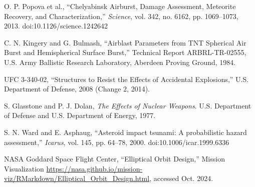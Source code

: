 \documentclass[conference]{IEEEtran}
\begin{document}
\begin{thebibliography}{00}
	O. P. Popova et al., ``Chelyabinsk Airburst, Damage Assessment, Meteorite Recovery, and Characterization,'' \textit{Science}, vol. 342, no. 6162, pp. 1069--1073, 2013. doi:10.1126/science.1242642

	C. N. Kingery and G. Bulmash, ``Airblast Parameters from TNT Spherical Air Burst and Hemispherical Surface Burst,'' Technical Report ARBRL-TR-02555, U.S. Army Ballistic Research Laboratory, Aberdeen Proving Ground, 1984.

	UFC 3-340-02, ``Structures to Resist the Effects of Accidental Explosions,'' U.S. Department of Defense, 2008 (Change 2, 2014).

	S. Glasstone and P. J. Dolan, \textit{The Effects of Nuclear Weapons}. U.S. Department of Defense and U.S. Department of Energy, 1977.

	S. N. Ward and E. Asphaug, ``Asteroid impact tsunami: A probabilistic hazard assessment,'' \textit{Icarus}, vol. 145, pp. 64--78, 2000. doi:10.1006/icar.1999.6336

	NASA Goddard Space Flight Center, ``Elliptical Orbit Design,'' Mission Visualization \url{https://nasa.github.io/mission-viz/RMarkdown/Elliptical_Orbit_Design.html}, accessed Oct. 2024.

\end{thebibliography}
\end{document}
